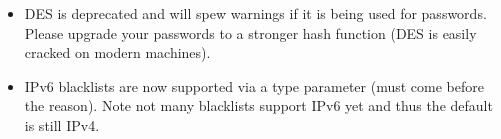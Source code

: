 \begin{itemize}

\item{
	DES is deprecated and will spew warnings if it is being used for
	passwords. Please upgrade your passwords to a stronger hash function
	(DES is easily cracked on modern machines).
}

\item{
	IPv6 blacklists are now supported via a type parameter (must come
	before the reason). Note not many blacklists support IPv6 yet and thus
	the default is still IPv4.
}

\end{itemize}

